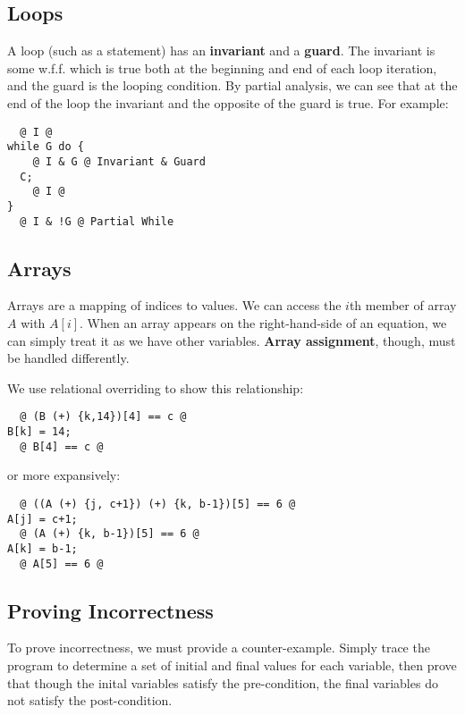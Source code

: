 \documentclass[12pt]{article}
\begin{document}
\subsection*{Loops}
A loop (such as a  statement) has an {\bf invariant} and a {\bf guard}. The invariant is some w.f.f. which is true both at the beginning and end of each loop iteration, and the guard is the looping condition. By partial  analysis, we can see that at the end of the loop the invariant and the opposite of the guard is true. For example:
\begin{verbatim}
  @ I @
while G do {
    @ I & G @ Invariant & Guard
  C;
    @ I @
}
  @ I & !G @ Partial While
\end{verbatim}

\subsection*{Arrays}
Arrays are a mapping of indices to values. We can access the $i$th member of array $A$ with $A[i]$. When an array appears on the right-hand-side of an equation, we can simply treat it as we have other variables. {\bf Array assignment}, though, must be handled differently.

We use relational overriding to show this relationship:
\begin{verbatim}
  @ (B (+) {k,14})[4] == c @
B[k] = 14;
  @ B[4] == c @
\end{verbatim}
or more expansively:
\begin{verbatim}
  @ ((A (+) {j, c+1}) (+) {k, b-1})[5] == 6 @
A[j] = c+1;
  @ (A (+) {k, b-1})[5] == 6 @
A[k] = b-1;
  @ A[5] == 6 @
\end{verbatim}

\subsection*{Proving Incorrectness}
To prove incorrectness, we must provide a counter-example. Simply trace the program to determine a set of initial and final values for each variable, then prove that though the inital variables satisfy the pre-condition, the final variables do not satisfy the post-condition.
\end{document}
